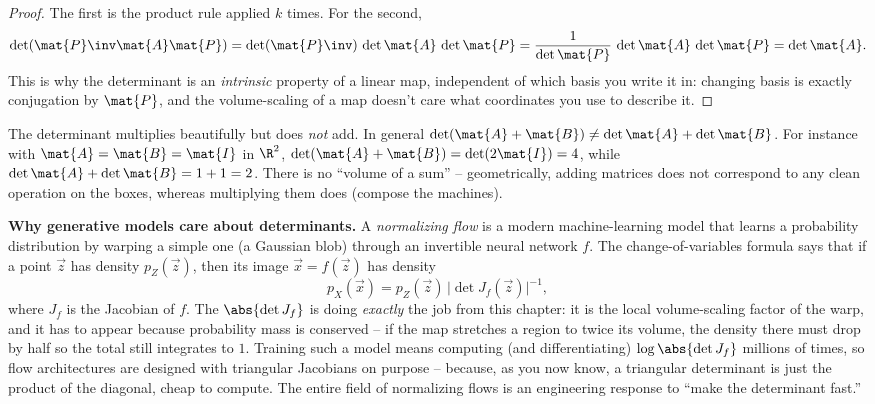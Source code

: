 \begin{proof}
The first is the product rule applied $k$ times. For the second,
\[
  \det(\mat{P}\inv\mat{A}\mat{P})
  = \det(\mat{P}\inv)\,\det\mat{A}\,\det\mat{P}
  = \frac{1}{\det\mat{P}}\,\det\mat{A}\,\det\mat{P}
  = \det\mat{A}.
\]
This is why the
determinant is an \emph{intrinsic} property of a linear map, independent of which
basis you write it in: changing basis is exactly conjugation by $\mat{P}$, and the
volume-scaling of a map doesn't care what coordinates you use to describe it.
\end{proof}

\begin{remark}
\label{ch21:remark-sum}
The determinant multiplies beautifully but does \emph{not} add. In general
$\det(\mat{A}+\mat{B}) \neq \det\mat{A} + \det\mat{B}$. For instance with
$\mat{A} = \mat{B} = \mat{I}$ in $\R^2$, $\det(\mat{A}+\mat{B}) = \det(2\mat{I})
= 4$, while $\det\mat{A} + \det\mat{B} = 1 + 1 = 2$. There is no ``volume of a
sum'' -- geometrically, adding matrices does not correspond to any clean operation
on the boxes, whereas multiplying them does (compose the machines).
\end{remark}

\begin{applicationbox}
\textbf{Why generative models care about determinants.} A \emph{normalizing flow}
is a modern machine-learning model that learns a probability distribution by
warping a simple one (a Gaussian blob) through an invertible neural network
$f$. The change-of-variables formula says that if a point $\vec z$ has density
$p_Z(\vec z)$, then its image $\vec x = f(\vec z)$ has density
\[
  p_X(\vec x) = p_Z(\vec z)\,\bigl|\det J_f(\vec z)\bigr|^{-1},
\]
where $J_f$ is the Jacobian of $f$. The $\abs{\det J_f}$ is doing \emph{exactly}
the job from this chapter: it is the local volume-scaling factor of the warp, and
it has to appear because probability mass is conserved -- if the map stretches a
region to twice its volume, the density there must drop by half so the total still
integrates to $1$. Training such a model means computing (and differentiating)
$\log\abs{\det J_f}$ millions of times, so flow architectures are designed with
triangular Jacobians on purpose -- because, as you now know, a triangular
determinant is just the product of the diagonal, cheap to compute. The entire
field of normalizing flows is an engineering response to ``make the determinant
fast.''
\end{applicationbox}

